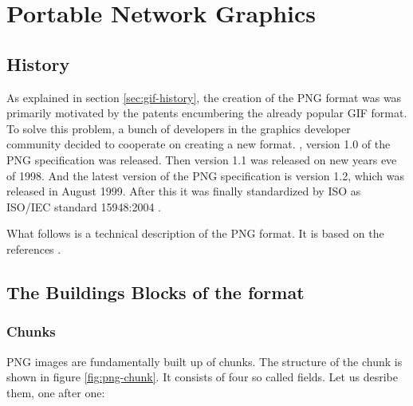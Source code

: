 \begin{comment}
  
\end{comment}


\chapter{Portable Network Graphics}
\label{cha:png}

\newcommand{\chnk}[1]{``#1''}

\section{History}

As explained in section \ref{sec:gif-history}, the creation of the PNG
format was was primarily motivated by the patents encumbering the
already popular GIF format. To solve this problem, a bunch of
developers in the graphics developer community decided to cooperate on
creating a new format. , version 1.0 of the PNG
specification was released. Then version 1.1 was released on new years
eve of 1998. And the latest version of the PNG specification is
version 1.2, which was released in August 1999. After this it was
finally standardized by ISO as ISO/IEC standard 15948:2004
\cite{roelofs09:_histor_portab_networ_graph_png_format,roelofs99:_png,roelofs:_portab_networ_graph_main}.

What follows is a technical description of the PNG format. It is based
on the references
\cite{boutel:_png_portab_networ_graph_specif_version12,roelofs99:_png,boutel:_png_portab_networ_graph_specif_version11}.

  \cite{sivonen:_sad_story_png_gamma_correc}

\section{The Buildings Blocks of the format}

\subsection{Chunks}

PNG images are fundamentally built up of chunks. The structure of the
chunk is shown in figure \ref{fig:png-chunk}. It consists of four so
called fields. Let us desribe them, one after one:

